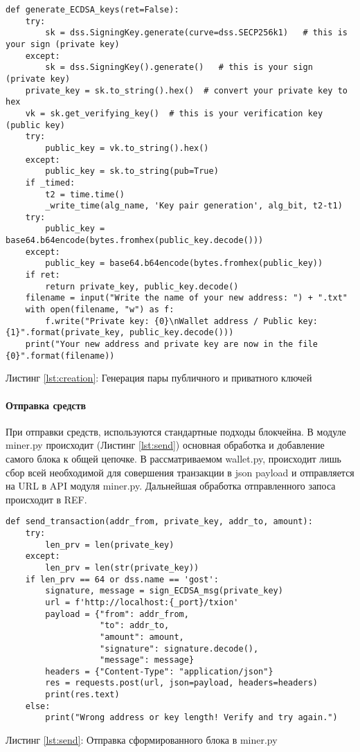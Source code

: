 \begin{center}
\begin{lstlisting}
def generate_ECDSA_keys(ret=False):
    try:
        sk = dss.SigningKey.generate(curve=dss.SECP256k1)   # this is your sign (private key)
    except:
        sk = dss.SigningKey().generate()   # this is your sign (private key)
    private_key = sk.to_string().hex()  # convert your private key to hex
    vk = sk.get_verifying_key()  # this is your verification key (public key)
    try:
        public_key = vk.to_string().hex()
    except:
        public_key = sk.to_string(pub=True)
    if _timed:
        t2 = time.time()
        _write_time(alg_name, 'Key pair generation', alg_bit, t2-t1)
    try:
        public_key = base64.b64encode(bytes.fromhex(public_key.decode()))
    except:
        public_key = base64.b64encode(bytes.fromhex(public_key))
    if ret:
        return private_key, public_key.decode()
    filename = input("Write the name of your new address: ") + ".txt"
    with open(filename, "w") as f:
        f.write("Private key: {0}\nWallet address / Public key: {1}".format(private_key, public_key.decode()))
    print("Your new address and private key are now in the file {0}".format(filename))
\end{lstlisting}\label{lst:creation}
    Листинг \ref{lst:creation}: Генерация пары публичного и приватного ключей
\end{center}



\paragraph{Отправка средств}
При отправки средств, используются стандартные подходы блокчейна. В модуле
{\small miner.py} происходит (Листинг \ref{lst:send}) основная обработка и
добавление самого блока к общей цепочке. В рассматриваемом {\small wallet.py},
происходит лишь сбор всей необходимой для совершения транзакции в json payload
и отправляется на URL в API модуля {\small miner.py}. Дальнейшая обработка
отправленного запоса происходит в REF.

\begin{center}
\begin{lstlisting}
def send_transaction(addr_from, private_key, addr_to, amount):
    try:
        len_prv = len(private_key)
    except:
        len_prv = len(str(private_key))
    if len_prv == 64 or dss.name == 'gost':
        signature, message = sign_ECDSA_msg(private_key)
        url = f'http://localhost:{_port}/txion'
        payload = {"from": addr_from,
                   "to": addr_to,
                   "amount": amount,
                   "signature": signature.decode(),
                   "message": message}
        headers = {"Content-Type": "application/json"}
        res = requests.post(url, json=payload, headers=headers)
        print(res.text)
    else:
        print("Wrong address or key length! Verify and try again.")
\end{lstlisting}\label{lst:send}
    Листинг \ref{lst:send}: Отправка сформированного блока в {\small miner.py}
\end{center}


